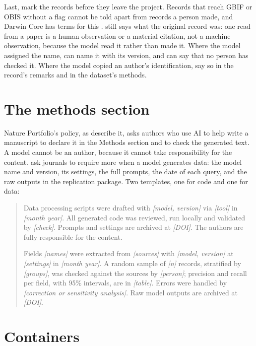 Last, mark the records before they leave the project. Records that reach GBIF
or OBIS without a flag cannot be told apart from records a person made, and
Darwin Core has terms for this \parencite{wieczorek2012darwincore}.
 still says what the original record was: one read from a
paper is a human observation or a material citation, not a machine
observation, because the model read it rather than made it. Where the model
assigned the name,  can name it with its version, and
 can say that no person has checked it.
Where the model copied an author's identification, say so in the record's
remarks and in the dataset's methods.

\section{The methods section}

Nature Portfolio's policy, as \textcite{naturemethods2026responsibly}
describe it, asks authors who use AI to help write a manuscript to declare it
in the Methods section and to check the generated text. A model cannot be an
author, because it cannot take responsibility for the content.
\textcite{coqueret2026randomness} ask journals to require more when a model
generates data: the model name and version, its settings, the full prompts,
the date of each query, and the raw outputs in the replication package. Two
templates, one for code and one for data:

\begin{quote}\small
Data processing scripts were drafted with \textit{[model, version]} via
\textit{[tool]} in \textit{[month year]}. All generated code was reviewed,
run locally and validated by \textit{[check]}. Prompts and settings are archived
at \textit{[DOI]}. The authors are fully responsible for the content.

Fields \textit{[names]} were extracted from \textit{[sources]} with
\textit{[model, version]} at \textit{[settings]} in \textit{[month year]}. A
random sample of \textit{[n]} records, stratified by \textit{[groups]}, was
checked against the sources by \textit{[person]}; precision and recall per
field, with 95\% intervals, are in \textit{[table]}. Errors were handled by
\textit{[correction or sensitivity analysis]}. Raw model outputs are archived
at \textit{[DOI]}.
\end{quote}

\section{Containers}

